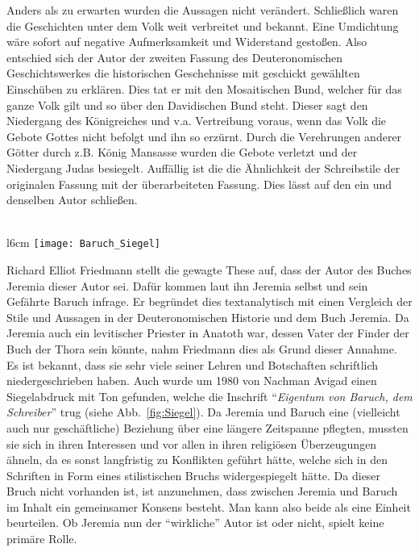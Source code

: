 Anders als zu erwarten wurden die Aussagen nicht verändert. Schließlich waren die Geschichten unter dem Volk weit verbreitet und bekannt. Eine Umdichtung wäre sofort auf negative Aufmerksamkeit und Widerstand gestoßen. Also entschied sich der Autor der zweiten Fassung des Deuteronomischen Geschichtswerkes die historischen Geschehnisse mit geschickt gewählten Einschüben zu erklären. Dies tat er mit den Mosaitischen Bund, welcher für das ganze Volk gilt und so über den Davidischen Bund steht. Dieser sagt den Niedergang des Königreiches und v.a. Vertreibung voraus, wenn das Volk die Gebote Gottes nicht befolgt und ihn so erzürnt. Durch die Verehrungen anderer Götter durch z.B. König Mansasse wurden die Gebote verletzt und der Niedergang Judas besiegelt. Auffällig ist die die Ähnlichkeit der Schreibstile der originalen Fassung mit der überarbeiteten Fassung. Dies lässt auf den ein und denselben Autor schließen.
\\~\\
\begin{wrapfigure}[14]{l}{6cm}
    \texttt{[image: Baruch\_Siegel]}
    \caption{Tonsiegel}
    \label{fig:Siegel}
\end{wrapfigure}

Richard Elliot Friedmann stellt die gewagte These auf, dass der Autor des Buches Jeremia dieser Autor sei. Dafür kommen laut ihn Jeremia selbst und sein Gefährte Baruch infrage. Er begründet dies textanalytisch mit einen Vergleich der Stile und Aussagen in der Deuteronomischen Historie und dem Buch Jeremia. Da Jeremia auch ein levitischer Priester in Anatoth war, dessen Vater der Finder der Buch der Thora sein könnte, nahm Friedmann dies als Grund dieser Annahme. Es ist bekannt, dass sie sehr viele seiner Lehren und Botschaften schriftlich niedergeschrieben haben. Auch wurde um 1980 von Nachman Avigad einen Siegelabdruck mit Ton gefunden, welche die Inschrift ``\textit{Eigentum von Baruch, dem Schreiber}'' trug (siehe Abb.\ \ref{fig:Siegel}). Da Jeremia und Baruch eine (vielleicht auch nur geschäftliche) Beziehung über eine längere Zeitspanne pflegten, mussten sie sich in ihren Interessen und vor allen in ihren religiösen Überzeugungen ähneln, da es sonst langfristig zu Konflikten geführt hätte, welche sich in den Schriften in Form eines stilistischen Bruchs widergespiegelt hätte. Da dieser Bruch nicht vorhanden ist, ist anzunehmen, dass zwischen Jeremia und Baruch im Inhalt ein gemeinsamer Konsens besteht. Man kann also beide als eine Einheit beurteilen. Ob Jeremia nun der ``wirkliche''  Autor ist oder nicht, spielt keine primäre Rolle.

